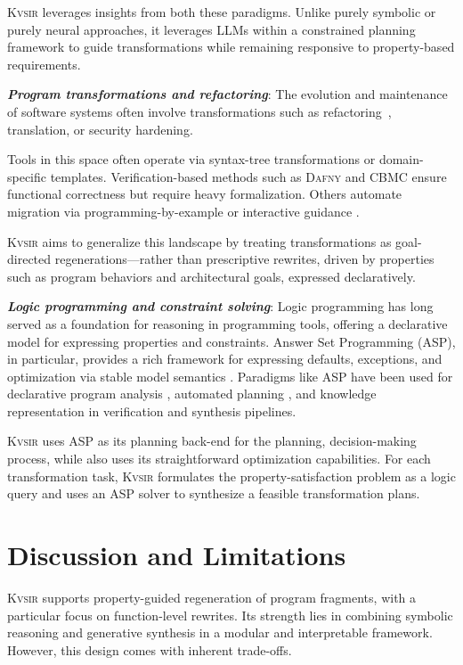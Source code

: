 \documentclass[sigplan,review,anonymous,10pt]{acmart}
\newcommand{\sys}{{\scshape Kv{\textalpha}sir}\xspace}
\newcommand{\heading}[1]{\vspace{2pt}\noindent\textbf{\emph{#1}}:\enspace}
\begin{document}
\sys leverages insights from both these paradigms.
Unlike purely symbolic or purely neural approaches, it leverages LLMs within a
constrained planning framework to guide transformations while remaining
responsive to property-based requirements.

\heading{Program transformations and refactoring}
The evolution and maintenance of software systems often involve transformations
such as refactoring~\cite{Fowler99,Mens04,Myers16}, translation, or security hardening. %

Tools in this space often operate via syntax-tree transformations or
domain-specific templates. Verification-based methods such as \textsc{Dafny}
\cite{leino2016dafny} and \textsc{CBMC} \cite{Clarke04} ensure functional correctness
but require heavy formalization.
Others automate migration via
programming-by-example or interactive guidance \cite{gulwani2017program, le2017interactive}.


\sys aims to generalize this landscape by treating transformations as
goal-directed regenerations---rather than prescriptive rewrites, driven by
properties such as program behaviors and architectural goals, expressed declaratively.

\heading{Logic programming and constraint solving}
Logic programming has long served as a foundation for reasoning in programming
tools, offering a declarative model for expressing properties and constraints.
Answer Set Programming (ASP), in particular, provides a rich framework for
expressing defaults, exceptions, and optimization via stable model semantics
\cite{Gelfond_2000, Gelfond_2002, Eiter_2009}. 
Paradigms like ASP have been used for
declarative program analysis \cite{benton2007interactive}, automated planning
\cite{nguyen2020explainable, son2022answersetplanningsurvey}, and knowledge
representation in verification and synthesis pipelines.

\sys uses ASP as its planning back-end for the planning, decision-making
process, while also uses its straightforward optimization capabilities.
For each transformation task, \sys formulates the property-satisfaction problem as a logic query and uses an ASP solver to
synthesize a feasible transformation plans.

\section{Discussion and Limitations}
\label{sec:discussion}

\sys supports property-guided regeneration of program fragments, with a
particular focus on function-level rewrites. Its strength lies in combining
symbolic reasoning and generative synthesis in a modular and interpretable
framework. However, this design comes with inherent trade-offs.
\end{document}
